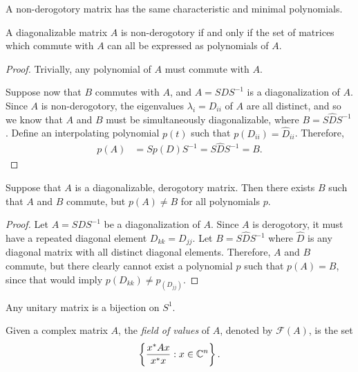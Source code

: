 \begin{defn}
    A non-derogotory matrix has the same characteristic and minimal polynomials.
\end{defn}

\begin{prop}
    A diagonalizable matrix $A$ is non-derogotory if and only if the set of matrices which commute with $A$ can all be expressed as polynomials of $A$.
\end{prop}

\begin{proof}
    Trivially, any polynomial of $A$ must commute with $A$.

    Suppose now that $B$ commutes with $A$, and $A = SDS^{-1}$ is a diagonalization of $A$. Since $A$ is non-derogotory, the eigenvalues $\lambda_i = D_{ii}$ of $A$ are all distinct, and so we know that $A$ and $B$ must be simultaneously diagonalizable, where $B = S\hat{D}S^{-1}$. Define an interpolating polynomial $p(t)$ such that $p(D_{ii}) = \hat{D}_{ii}$. Therefore,
    \begin{align*}
        p(A) &= Sp(D)S^{-1} = S\hat{D}S^{-1} = B.
    \end{align*}
\end{proof}

\begin{prop}
    Suppose that $A$ is a diagonalizable, derogotory matrix. Then there exists $B$ such that $A$ and $B$ commute, but $p(A) \neq B$ for all polynomials $p$.
\end{prop}

\begin{proof}
    Let $A = SDS^{-1}$ be a diagonalization of $A$. Since $A$ is derogotory, it must have a repeated diagonal element $D_{kk} = D_{jj}$. Let $B = S\hat{D}S^{-1}$ where $\hat{D}$ is any diagonal matrix with all distinct diagonal elements. Therefore, $A$ and $B$ commute, but there clearly cannot exist a polynomial $p$ such that $p(A) = B$, since that would imply $p(D_{kk}) \neq p_(D_{jj})$.
\end{proof}

\begin{lemma}
    Any unitary matrix is a bijection on $S^1$.
\end{lemma}

\begin{defn}
    Given a complex matrix $A$, the \emph{field of values} of $A$, denoted by $\mathcal{F}(A)$, is the set
    \begin{align*}
        \left\{ \frac{x^*Ax}{x^*x} : x \in \mathbb{C}^n \right\}.
    \end{align*}
\end{defn}

